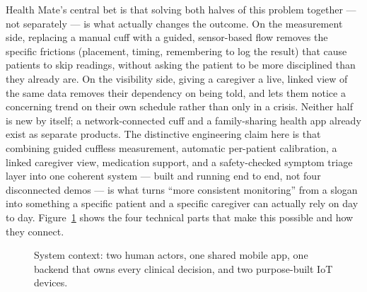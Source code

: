 \documentclass[12pt,a4paper]{report}
\begin{document}
Health Mate's central bet is that solving both halves of this problem together
--- not separately --- is what actually changes the outcome. On the
measurement side, replacing a manual cuff with a guided, sensor-based flow
removes the specific frictions (placement, timing, remembering to log the
result) that cause patients to skip readings, without asking the patient to
be more disciplined than they already are. On the visibility side, giving a
caregiver a live, linked view of the same data removes their dependency on
being told, and lets them notice a concerning trend on their own schedule
rather than only in a crisis. Neither half is new by itself; a
network-connected cuff and a family-sharing health app already exist as
separate products. The distinctive engineering claim here is that combining
guided cuffless measurement, automatic per-patient calibration, a linked
caregiver view, medication support, and a safety-checked symptom triage layer
into one coherent system --- built and running end to end, not four
disconnected demos --- is what turns ``more consistent monitoring'' from a
slogan into something a specific patient and a specific caregiver can actually
rely on day to day. Figure~\ref{fig:context} shows the four technical parts
that make this possible and how they connect.

\begin{figure}[H]
\centering
{}%
\caption{System context: two human actors, one shared mobile app, one backend
that owns every clinical decision, and two purpose-built IoT devices.}
\label{fig:context}
\end{figure}
\end{document}
